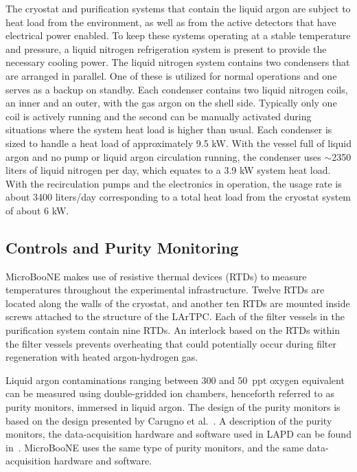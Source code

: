 The cryostat and purification systems that contain the liquid argon are subject to heat load from the environment, as well as from the active detectors that have electrical power enabled.  To keep these systems operating at a stable temperature and pressure, a liquid nitrogen refrigeration system is present to provide the necessary cooling power.  The liquid nitrogen system contains two condensers that are arranged in parallel.  One of these is utilized for normal operations and one serves as a backup on standby.  Each condenser contains two liquid nitrogen coils, an inner and an outer, with the gas argon on the shell side.  Typically only one coil is actively running and the second can be manually activated during situations where the system heat load is higher than usual.  Each condenser is sized to handle a heat load of approximately 9.5 kW.  With the vessel full of liquid argon and no pump or liquid argon circulation running, the condenser uses $\sim$2350 liters of liquid nitrogen per day, which equates to a 3.9 kW system heat load.  With the recirculation pumps and the electronics in operation, the usage rate is about 3400 liters/day corresponding to a total heat load from the cryostat system of about 6 kW.  
%


\subsection{Controls and Purity Monitoring}

MicroBooNE makes use of resistive thermal devices (RTDs) to measure temperatures throughout the experimental infrastructure. Twelve RTDs are located along the walls of the cryostat, and another ten RTDs are mounted inside screws attached to the structure of the LArTPC. Each of the filter vessels in the purification system contain nine RTDs.  An interlock based on the RTDs within the filter vessels prevents overheating that could potentially occur during filter regeneration with heated argon-hydrogen gas.

Liquid argon contaminations ranging between 300 and 50~ppt oxygen equivalent can be measured using double-gridded ion chambers, henceforth referred to as purity monitors, immersed in liquid argon. The design of the purity monitors is based on the design presented by Carugno et al.~\cite{Carugno:1990-purityMonitor}.  A description of the purity monitors, the data-acquisition hardware and software used in LAPD can be found in~\cite{Adamowski:2014-LAPD}. MicroBooNE uses the same type of purity monitors, and the same data-acquisition hardware and software. 

